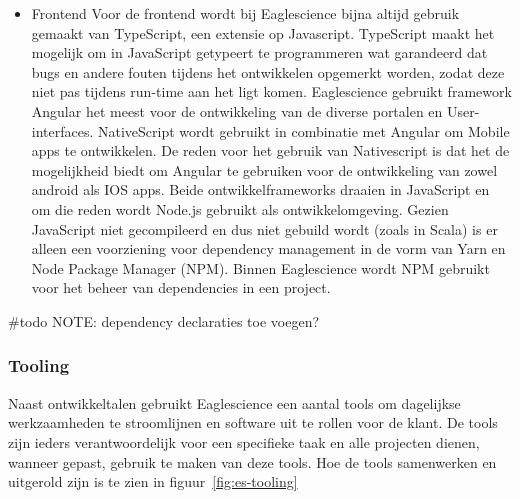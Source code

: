 \begin{itemize}
    \item {Frontend}
    Voor de frontend wordt bij Eaglescience bijna altijd gebruik gemaakt van TypeScript, een extensie op Javascript. TypeScript maakt het mogelijk om in JavaScript getypeert te programmeren wat garandeerd dat bugs en andere fouten tijdens het ontwikkelen opgemerkt worden, zodat deze niet pas tijdens run-time aan het ligt komen. Eaglescience gebruikt framework Angular het meest voor de ontwikkeling van de diverse portalen en User-interfaces. NativeScript wordt gebruikt in combinatie met Angular om Mobile apps te ontwikkelen. De reden voor het gebruik van Nativescript is dat het de mogelijkheid biedt om Angular te gebruiken voor de ontwikkeling van zowel android als IOS apps. Beide ontwikkelframeworks draaien in JavaScript en om die reden wordt Node.js gebruikt als ontwikkelomgeving. Gezien JavaScript niet gecompileerd en dus niet gebuild wordt (zoals in Scala) is er alleen een voorziening voor dependency management in de vorm van Yarn en Node Package Manager (NPM). Binnen Eaglescience wordt NPM gebruikt voor het beheer van dependencies in een project.
\end{itemize}

#todo NOTE: dependency declaraties toe voegen?

\subsubsection{Tooling}\label{subsubsec:tooling}
Naast ontwikkeltalen gebruikt Eaglescience een aantal tools om dagelijkse werkzaamheden te stroomlijnen en software uit te rollen voor de klant. De tools zijn ieders verantwoordelijk voor een specifieke taak en alle projecten dienen, wanneer gepast, gebruik te maken van deze tools. Hoe de tools samenwerken en uitgerold zijn is te zien in figuur~\ref{fig:es-tooling}

